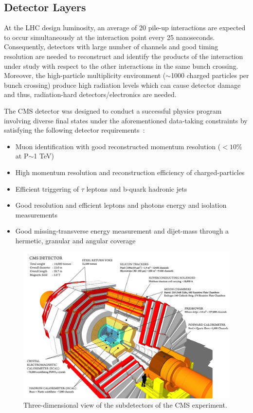 \subsection{Detector Layers}
At the LHC design luminosity, an average of 20 pile-up interactions are expected to occur simultaneously at the interaction point every 25 nanoseconds. Consequently, detectors with large number of channels and good timing resolution are needed to reconstruct and identify the products of the interaction under study with respect to the other interactions in the same bunch crossing. Moreover, the high-particle multiplicity environment ($\sim$1000 charged particles per bunch crossing) produce high radiation levels which can cause detector damage and thus, radiation-hard detectors/electronics are needed.

The CMS detector was designed to conduct a successful physics program involving diverse final states under the aforementioned data-taking constraints by satisfying the following detector requirements~\cite{CMS:2008xjf}:
\begin{itemize}
    \item Muon identification with good reconstructed momentum resolution ($<10\%$ at P$\sim$1 TeV)
    \item High momentum resolution and reconstruction efficiency of charged-particles
    \item Efficient triggering of $\tau$ leptons and b-quark hadronic jets
    \item Good resolution and efficient leptons and photons energy and isolation measurements
    \item Good missing-transverse energy measurement and dijet-mass through a hermetic, granular and angular coverage 
\end{itemize}

\begin{figure}[ht!]
\centering
\includegraphics[width=1.0\textwidth]{Figures/Apparatus/cmsdetector.png}
\caption[Three-dimensional view of the subdetectors of the CMS experiment]{Three-dimensional view of the subdetectors of the CMS experiment.}
\label{fig:cmsdetector}
\end{figure}

